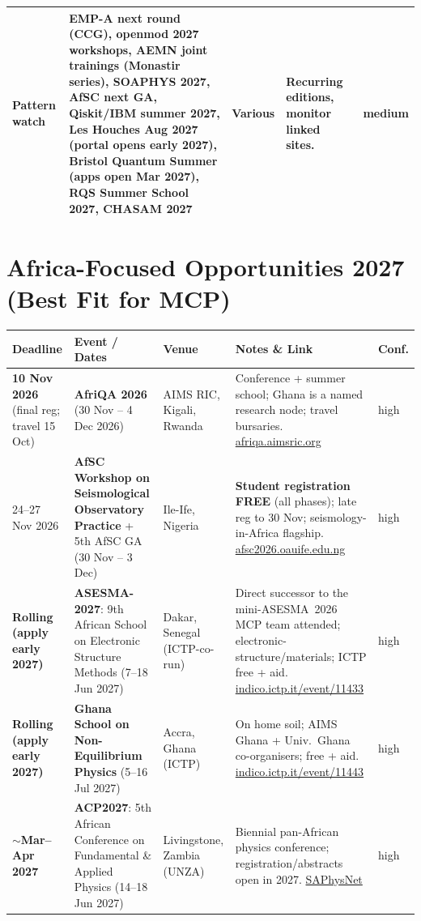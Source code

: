 \documentclass[11pt,a4paper]{article}
\begin{document}
\begin{longtable}{@{}p{3.2cm}p{3.0cm}p{2.5cm}p{5.2cm}p{1.6cm}@{}}
\midrule
\textbf{Pattern watch} & EMP-A next round (CCG), openmod 2027 workshops, AEMN joint trainings (Monastir series), SOAPHYS 2027, AfSC next GA, Qiskit/IBM summer 2027, Les Houches Aug 2027 (portal opens early 2027), Bristol Quantum Summer (apps open Mar 2027), RQS Summer School 2027, CHASAM 2027 & Various & Recurring editions, monitor linked sites. & medium \\
\bottomrule
\end{longtable}

\section{Africa-Focused Opportunities 2027 (Best Fit for MCP)}

\begin{longtable}{@{}p{3.2cm}p{3.0cm}p{2.5cm}p{5.2cm}p{1.6cm}@{}}
\toprule
\textbf{Deadline} & \textbf{Event / Dates} & \textbf{Venue} & \textbf{Notes \& Link} & \textbf{Conf.} \\
\midrule
\endhead
\textbf{10 Nov 2026} (final reg; travel 15 Oct) & \textbf{AfriQA 2026} (30 Nov -- 4 Dec 2026) & AIMS RIC, Kigali, Rwanda & Conference + summer school; Ghana is a named research node; travel bursaries. \href{https://afriqa.aimsric.org/}{afriqa.aimsric.org} & high \\
\midrule
24--27 Nov 2026 & \textbf{AfSC Workshop on Seismological Observatory Practice} + 5th AfSC GA (30 Nov -- 3 Dec) & Ile-Ife, Nigeria & \textbf{Student registration FREE} (all phases); late reg to 30 Nov; seismology-in-Africa flagship. \href{https://afsc2026.oauife.edu.ng/}{afsc2026.oauife.edu.ng} & high \\
\midrule
\textbf{Rolling (apply early 2027)} & \textbf{ASESMA-2027}: 9th African School on Electronic Structure Methods (7--18 Jun 2027) & Dakar, Senegal (ICTP-co-run) & Direct successor to the mini-ASESMA~2026 MCP team attended; electronic-structure/materials; ICTP free + aid. \href{https://indico.ictp.it/event/11433}{indico.ictp.it/event/11433} & high \\
\midrule
\textbf{Rolling (apply early 2027)} & \textbf{Ghana School on Non-Equilibrium Physics} (5--16 Jul 2027) & Accra, Ghana (ICTP) & On home soil; AIMS Ghana + Univ.\ Ghana co-organisers; free + aid. \href{https://indico.ictp.it/event/11443/}{indico.ictp.it/event/11443} & high \\
\midrule
\textbf{$\sim$Mar--Apr 2027} & \textbf{ACP2027}: 5th African Conference on Fundamental \& Applied Physics (14--18 Jun 2027) & Livingstone, Zambia (UNZA) & Biennial pan-African physics conference; registration/abstracts open in 2027. \href{https://saphysnet.saip.org.za/upcoming-events/}{SAPhysNet} & high \\

\end{longtable}
\end{document}
